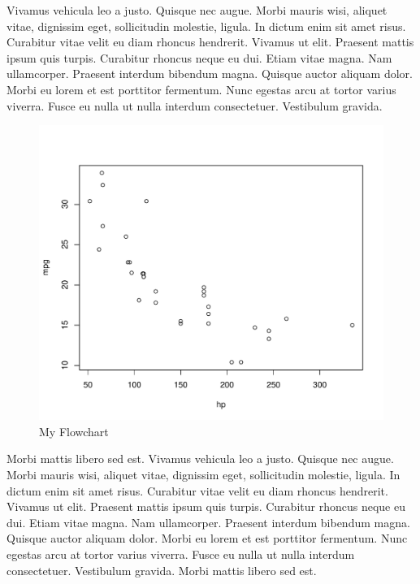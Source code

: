 \documentclass[]{article}
\author{}
\date{\vspace{-2.5em}}
\begin{document}
Vivamus vehicula leo a justo. Quisque nec augue. Morbi mauris wisi,
aliquet vitae, dignissim eget, sollicitudin molestie, ligula. In dictum
enim sit amet risus. Curabitur vitae velit eu diam rhoncus hendrerit.
Vivamus ut elit. Praesent mattis ipsum quis turpis. Curabitur rhoncus
neque eu dui. Etiam vitae magna. Nam ullamcorper. Praesent interdum
bibendum magna. Quisque auctor aliquam dolor. Morbi eu lorem et est
porttitor fermentum. Nunc egestas arcu at tortor varius viverra. Fusce
eu nulla ut nulla interdum consectetuer. Vestibulum gravida.

\begin{figure}

\hfill{}\includegraphics[width=.7\textwidth]{test_files/figure-latex/unnamed-chunk-2-1} 

\caption{My Flowchart}\label{fig:unnamed-chunk-2}
\end{figure}

Morbi mattis libero sed est. Vivamus vehicula leo a justo. Quisque nec
augue. Morbi mauris wisi, aliquet vitae, dignissim eget, sollicitudin
molestie, ligula. In dictum enim sit amet risus. Curabitur vitae velit
eu diam rhoncus hendrerit. Vivamus ut elit. Praesent mattis ipsum quis
turpis. Curabitur rhoncus neque eu dui. Etiam vitae magna. Nam
ullamcorper. Praesent interdum bibendum magna. Quisque auctor aliquam
dolor. Morbi eu lorem et est porttitor fermentum. Nunc egestas arcu at
tortor varius viverra. Fusce eu nulla ut nulla interdum consectetuer.
Vestibulum gravida. Morbi mattis libero sed est.
\end{document}
